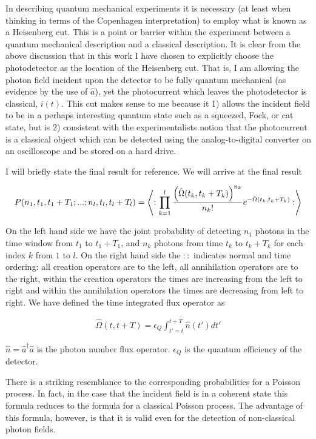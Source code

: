 \documentclass[12pt]{article}
\begin{document}
In describing quantum mechanical experiments it is necessary (at least when thinking in terms of the Copenhagen interpretation) to employ what is known as a Heisenberg cut. This is a point or barrier within the experiment between a quantum mechanical description and a classical description. It is clear from the above discussion that in this work I have chosen to explicitly choose the photodetector as the location of the Heisenberg cut. That is, I am allowing the photon field incident upon the detector to be fully quantum mechanical (as evidence by the use of $\hat{a}$), yet the photocurrent which leaves the photodetector is classical, $i(t)$. This cut makes sense to me because it 1) allows the incident field to be in a perhaps interesting quantum state such as a squeezed, Fock, or cat state, but is 2) consistent with the experimentalists notion that the photocurrent is a classical object which can be detected using the analog-to-digital converter on an oscilloscope and be stored on a hard drive.

I will briefly state the final result for reference. We will arrive at the final result

\begin{align}
P(n_1,t_1,t_1+T_1;...;n_l,t_l,t_l+T_l) = \Braket{:\prod_{k=1}^l \frac{\left(\hat{\Omega}(t_k,t_k+T_k)\right)^{n_k}}{n_k!} e^{-\hat{\Omega}(t_k,t_k+T_k)}:}
\end{align}

On the left hand side we have the joint probability of detecting $n_1$ photons in the time window from $t_1$ to $t_1 + T_1$, and $n_k$ photons from time $t_k$ to $t_k+T_k$ for each index $k$ from $1$ to $l$. On the right hand side the $::$ indicates normal and time ordering: all creation operators are to the left, all annihilation operators are to the right, within the creation operators the times are increasing from the left to right and within the annihilation operators the times are decreasing from left to right.
We have defined the time integrated flux operator as

\begin{align}
\hat{\Omega}(t,t+T) = \epsilon_Q \int_{t'=t}^{t+T} \hat{n}(t') dt'
\end{align}

 $\hat{n} = \hat{a}^{\dag} \hat{a}$ is the photon number flux operator. $\epsilon_Q$ is the quantum efficiency of the detector.

There is a striking resemblance to the corresponding probabilities for a Poisson process. In fact, in the case that the incident field is in a coherent state this formula reduces to the formula for a classical Poisson process. The advantage of this formula, however, is that it is valid even for the detection of non-classical photon fields. 
\end{document}
